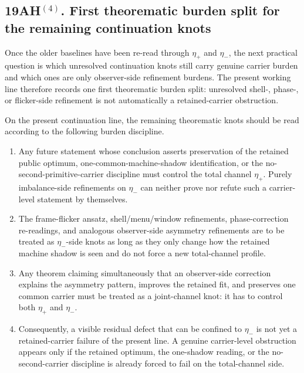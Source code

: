 \subsection*{19AH$^{(4)}$. First theorematic burden split for the remaining continuation knots}
Once the older baselines have been re-read through \(\eta_+\) and \(\eta_-\), the next practical question is which unresolved continuation knots still carry genuine carrier burden and which ones are only observer-side refinement burdens. The present working line therefore records one first theorematic burden split: unresolved shell-, phase-, or flicker-side refinement is not automatically a retained-carrier obstruction.

\begin{proposition}
On the present continuation line, the remaining theorematic knots should be read according to the following burden discipline.
\begin{enumerate}[leftmargin=2em]
 \item Any future statement whose conclusion asserts preservation of the retained public optimum, one-common-machine-shadow identification, or the no-second-primitive-carrier discipline must control the total channel \(\eta_+\). Purely imbalance-side refinements on \(\eta_-\) can neither prove nor refute such a carrier-level statement by themselves.
 \item The frame-flicker ansatz, shell/menu/window refinements, phase-correction re-readings, and analogous observer-side asymmetry refinements are to be treated as \(\eta_-\)-side knots as long as they only change how the retained machine shadow is seen and do not force a new total-channel profile.
 \item Any theorem claiming simultaneously that an observer-side correction explains the asymmetry pattern, improves the retained fit, and preserves one common carrier must be treated as a joint-channel knot: it has to control both \(\eta_+\) and \(\eta_-\).
 \item Consequently, a visible residual defect that can be confined to \(\eta_-\) is not yet a retained-carrier failure of the present line. A genuine carrier-level obstruction appears only if the retained optimum, the one-shadow reading, or the no-second-carrier discipline is already forced to fail on the total-channel side.
\end{enumerate}
\end{proposition}

